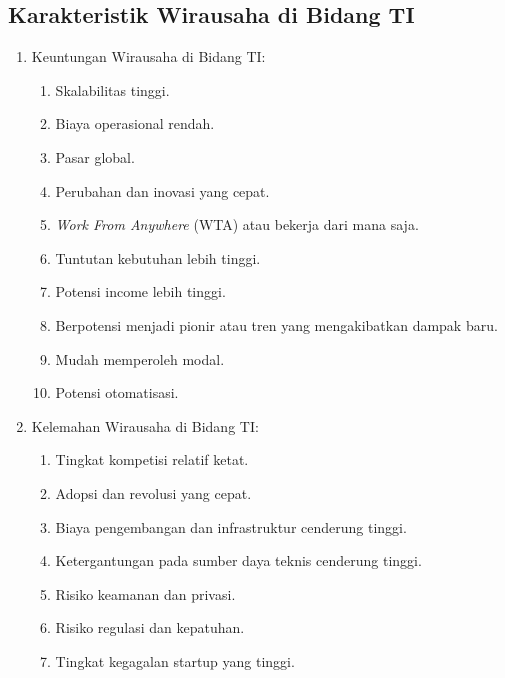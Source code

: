 \subsection{Karakteristik Wirausaha di Bidang TI}
\begin{enumerate}
\item Keuntungan Wirausaha di Bidang TI:
  \begin{enumerate}
  \item Skalabilitas tinggi.
  \item Biaya operasional rendah.
  \item Pasar global.
  \item Perubahan dan inovasi yang cepat.
  \item \textit{Work From Anywhere} (WTA) atau bekerja dari mana saja.
  \item Tuntutan kebutuhan lebih tinggi.
  \item Potensi income lebih tinggi.
  \item Berpotensi menjadi pionir atau tren yang mengakibatkan dampak baru.
  \item Mudah memperoleh modal.
  \item Potensi otomatisasi.
  \end{enumerate}
\item Kelemahan Wirausaha di Bidang TI:
  \begin{enumerate}
  \item Tingkat kompetisi relatif ketat.
  \item Adopsi dan revolusi yang cepat.
  \item Biaya pengembangan dan infrastruktur cenderung tinggi.
  \item Ketergantungan pada sumber daya teknis cenderung tinggi.
  \item Risiko keamanan dan privasi.
  \item Risiko regulasi dan kepatuhan.
  \item Tingkat kegagalan startup yang tinggi.
  \end{enumerate}
\end{enumerate}

